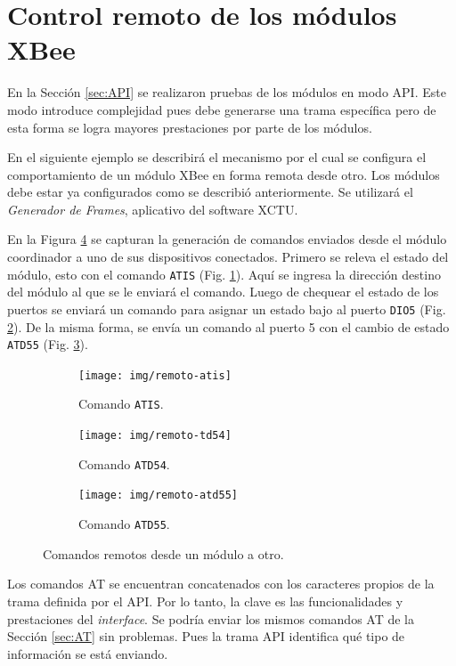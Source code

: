 \documentclass[11pt,oneside,spanish,a4paper]{article}
\begin{document}
\section{Control remoto de los módulos XBee}
\label{sec:remoto}

En la Sección \ref{sec:API} se realizaron pruebas de los módulos en modo
API. Este modo introduce complejidad pues debe generarse una trama
específica pero de esta forma se logra mayores prestaciones por parte
de los módulos. 

En el siguiente ejemplo se describirá el mecanismo por el cual se
configura el comportamiento de un módulo XBee en forma remota desde
otro. Los módulos debe estar ya configurados como se describió
anteriormente. Se utilizará el \emph{Generador de Frames}, aplicativo
del software XCTU. 

En la Figura \ref{fig:remotos-dio5} se capturan la generación de
comandos enviados desde el módulo coordinador a uno de sus
dispositivos conectados. Primero se releva el estado del módulo, esto
con el comando \texttt{ATIS} (Fig. \ref{fig:remoto-atis}). Aquí se
ingresa la dirección destino del módulo al que se le enviará el
comando. Luego de chequear el estado de los puertos se enviará un
comando para asignar un estado bajo al puerto \texttt{DIO5}
(Fig. \ref{fig:remoto-atd54}). De la misma forma, se envía un comando
al puerto 5 con el cambio de estado \texttt{ATD55}
(Fig. \ref{fig:remoto-atd55}).

\begin{figure}[h]
  \centering
  \begin{subfigure}{0.3\textwidth}
    \centering
    \texttt{[image: img/remoto-atis]}
    \caption{Comando \texttt{ATIS}.}
    \label{fig:remoto-atis}
  \end{subfigure}
  \hfill
  \begin{subfigure}{0.3\textwidth}
    \centering
    \texttt{[image: img/remoto-td54]}
    \caption{Comando \texttt{ATD54}.}
    \label{fig:remoto-atd54}
  \end{subfigure}
  \hfill
  \begin{subfigure}{0.3\textwidth}
    \centering
    \texttt{[image: img/remoto-atd55]}
    \caption{Comando \texttt{ATD55}.}
    \label{fig:remoto-atd55}
  \end{subfigure}
  \caption{Comandos remotos desde un módulo a otro.}
  \label{fig:remotos-dio5}
\end{figure}

Los comandos AT se encuentran concatenados con los caracteres propios
de la trama definida por el API. Por lo tanto, la clave es las
funcionalidades y prestaciones del \textsl{interface}. Se podría enviar los
mismos comandos AT de la Sección \ref{sec:AT} sin problemas. Pues la
trama API identifica qué tipo de información se está enviando.
\end{document}
